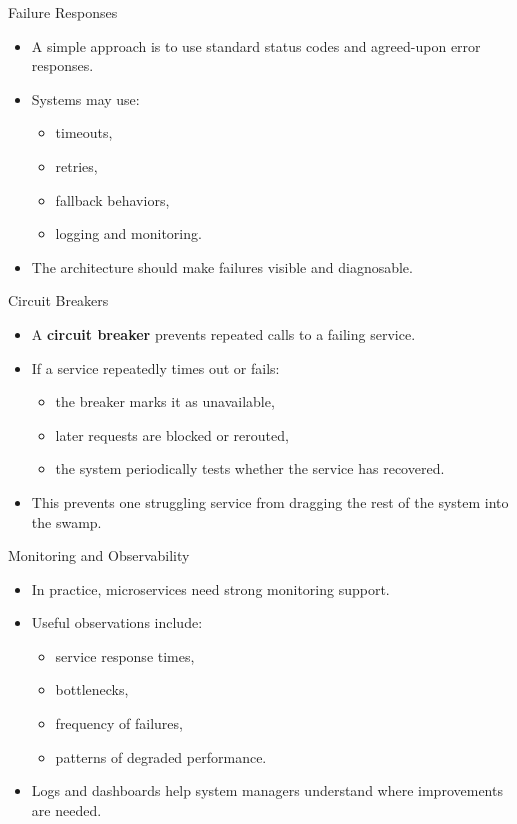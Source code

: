 \begin{frame}{Failure Responses}
\begin{itemize}
    \item A simple approach is to use standard status codes and agreed-upon error responses.
    \item Systems may use:
    \begin{itemize}
        \item timeouts,
        \item retries,
        \item fallback behaviors,
        \item logging and monitoring.
    \end{itemize}
    \item The architecture should make failures visible and diagnosable.
\end{itemize}
\end{frame}

\begin{frame}{Circuit Breakers}
\begin{itemize}
    \item A \textbf{circuit breaker} prevents repeated calls to a failing service.
    \item If a service repeatedly times out or fails:
    \begin{itemize}
        \item the breaker marks it as unavailable,
        \item later requests are blocked or rerouted,
        \item the system periodically tests whether the service has recovered.
    \end{itemize}
    \item This prevents one struggling service from dragging the rest of the system into the swamp.
\end{itemize}
\end{frame}

\begin{frame}{Monitoring and Observability}
\begin{itemize}
    \item In practice, microservices need strong monitoring support.
    \item Useful observations include:
    \begin{itemize}
        \item service response times,
        \item bottlenecks,
        \item frequency of failures,
        \item patterns of degraded performance.
    \end{itemize}
    \item Logs and dashboards help system managers understand where improvements are needed.
\end{itemize}
\end{frame}

